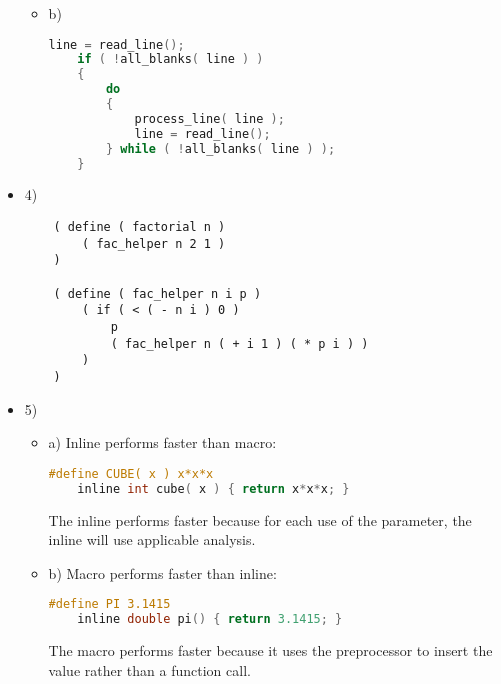 \documentclass[ 12pt ]{article}
\begin{document}
\begin{itemize}
\begin{itemize}
		\item[] b)
		\begin{lstlisting}[language=C]
    line = read_line();
    if ( !all_blanks( line ) )
    {
        do
        {
            process_line( line );
            line = read_line();
        } while ( !all_blanks( line ) );
    }
		\end{lstlisting}
	\end{itemize}
	\newpage

	\item[] {4) \large}
	\begin{lstlisting}
    ( define ( factorial n )
        ( fac_helper n 2 1 )
    )

    ( define ( fac_helper n i p )
        ( if ( < ( - n i ) 0 )
            p
            ( fac_helper n ( + i 1 ) ( * p i ) )
        )
    )
	\end{lstlisting}

	\item[] {5) \large}
	\begin{itemize}
		\item[] a)
		Inline performs faster than macro:
		\begin{lstlisting}[language=C]
    #define CUBE( x ) x*x*x
    inline int cube( x ) { return x*x*x; }
		\end{lstlisting}
		The inline performs faster because for each use of the parameter, the inline will use applicable analysis.

		\item[] b)
		Macro performs faster than inline:
		\begin{lstlisting}[language=C]
    #define PI 3.1415
    inline double pi() { return 3.1415; }
		\end{lstlisting}
		The macro performs faster because it uses the preprocessor to insert the value rather than a function call.
	\end{itemize}

\end{itemize}
\end{document}
